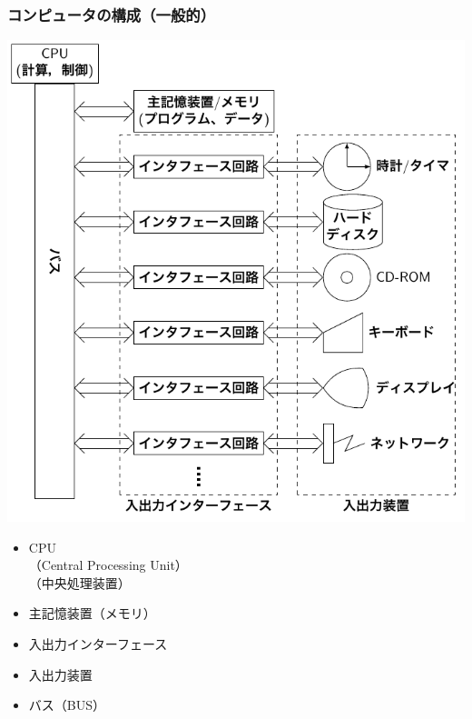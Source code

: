 \documentclass{beamer}                 %
\begin{document}
\begin{frame}
  \frametitle{コンピュータの構成（一般的）}
  \begin{minipage}{0.59\columnwidth}
    \centerline{\includegraphics[scale=0.63]{../Tikz/kousei1.pdf}}
  \end{minipage}
  \begin{minipage}{0.4\columnwidth}
    \begin{itemize}
    \item CPU\\
      {\small（Central Processing Unit）}\\
      {\small（中央処理装置）}\\
      \vspace{4ex}
    \item 主記憶装置（メモリ）\\
      \vspace{4ex}
    \item 入出力インターフェース\\
      \vspace{4ex}
    \item 入出力装置\\
      \vspace{4ex}
    \item バス（BUS）\\
      \vspace{6ex}
    \end{itemize}
  \end{minipage}
\end{frame}
\end{document}
